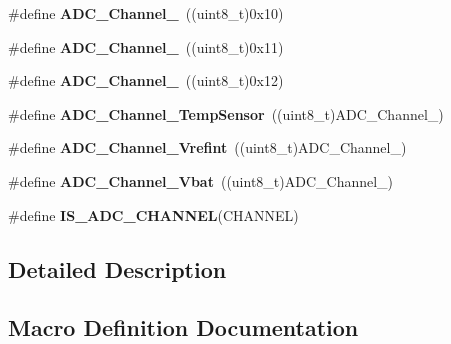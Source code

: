 \begin{DoxyCompactItemize}
\item 
\#define {\bfseries A\+D\+C\+\_\+\+Channel\+\_}~((uint8\+\_\+t)0x10)\hypertarget{group___a_d_c__channels_ga52fb09ae9a0333a0e071da106466c659}{}\label{group___a_d_c__channels_ga52fb09ae9a0333a0e071da106466c659}

\item 
\#define {\bfseries A\+D\+C\+\_\+\+Channel\+\_}~((uint8\+\_\+t)0x11)\hypertarget{group___a_d_c__channels_ga58cdfe3a5625f198116d163b09698cea}{}\label{group___a_d_c__channels_ga58cdfe3a5625f198116d163b09698cea}

\item 
\#define {\bfseries A\+D\+C\+\_\+\+Channel\+\_}~((uint8\+\_\+t)0x12)\hypertarget{group___a_d_c__channels_gacc9277b9f14b55c5dff2f493dc5e7797}{}\label{group___a_d_c__channels_gacc9277b9f14b55c5dff2f493dc5e7797}

\item 
\#define {\bfseries A\+D\+C\+\_\+\+Channel\+\_\+\+Temp\+Sensor}~((uint8\+\_\+t)A\+D\+C\+\_\+\+Channel\+\_)\hypertarget{group___a_d_c__channels_ga1efc096b8d4a8d15c4a7d91f5c03c6c7}{}\label{group___a_d_c__channels_ga1efc096b8d4a8d15c4a7d91f5c03c6c7}

\item 
\#define {\bfseries A\+D\+C\+\_\+\+Channel\+\_\+\+Vrefint}~((uint8\+\_\+t)A\+D\+C\+\_\+\+Channel\+\_)\hypertarget{group___a_d_c__channels_ga5d48ded5138e6f1efe3a7634eff4d125}{}\label{group___a_d_c__channels_ga5d48ded5138e6f1efe3a7634eff4d125}

\item 
\#define {\bfseries A\+D\+C\+\_\+\+Channel\+\_\+\+Vbat}~((uint8\+\_\+t)A\+D\+C\+\_\+\+Channel\+\_)\hypertarget{group___a_d_c__channels_gae86cee19a99a31d5ed3f95f64d81301a}{}\label{group___a_d_c__channels_gae86cee19a99a31d5ed3f95f64d81301a}

\item 
\#define {\bfseries I\+S\+\_\+\+A\+D\+C\+\_\+\+C\+H\+A\+N\+N\+EL}(C\+H\+A\+N\+N\+EL)
\end{DoxyCompactItemize}


\subsection{Detailed Description}


\subsection{Macro Definition Documentation}
